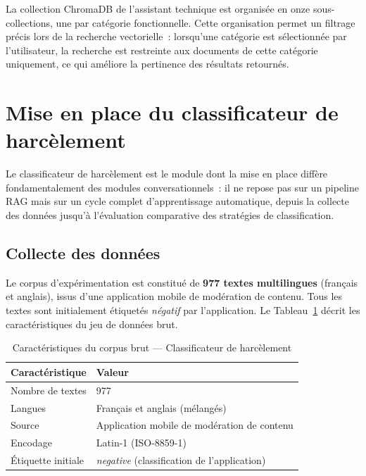 La collection ChromaDB de l'assistant technique est organisée en onze sous-collections,
une par catégorie fonctionnelle.
Cette organisation permet un filtrage précis lors de la recherche vectorielle~:
lorsqu'une catégorie est sélectionnée par l'utilisateur, la recherche
est restreinte aux documents de cette catégorie uniquement,
ce qui améliore la pertinence des résultats retournés.

\section{Mise en place du classificateur de harcèlement}

Le classificateur de harcèlement est le module dont la mise en place
diffère fondamentalement des modules conversationnels~:
il ne repose pas sur un pipeline RAG mais sur un cycle complet
d'apprentissage automatique, depuis la collecte des données
jusqu'à l'évaluation comparative des stratégies de classification.

\subsection{Collecte des données}

Le corpus d'expérimentation est constitué de \textbf{977 textes multilingues}
(français et anglais), issus d'une application mobile de modération de contenu.
Tous les textes sont initialement étiquetés \textit{négatif} par l'application.
Le Tableau~\ref{tab:corpus_classif} décrit les caractéristiques du jeu de données brut.

\vspace{6pt}
\begin{table}[H]
\centering
\caption{Caractéristiques du corpus brut — Classificateur de harcèlement}
\label{tab:corpus_classif}
\small
\begin{tabular}{|l|l|}
\hline
\textbf{Caractéristique} & \textbf{Valeur} \\
\hline
Nombre de textes        & 977 \\
\hline
Langues                 & Français et anglais (mélangés) \\
\hline
Source                  & Application mobile de modération de contenu \\
\hline
Encodage                & Latin-1 (ISO-8859-1) \\
\hline
Étiquette initiale      & \textit{negative} (classification de l'application) \\
\hline
\end{tabular}
\end{table}

